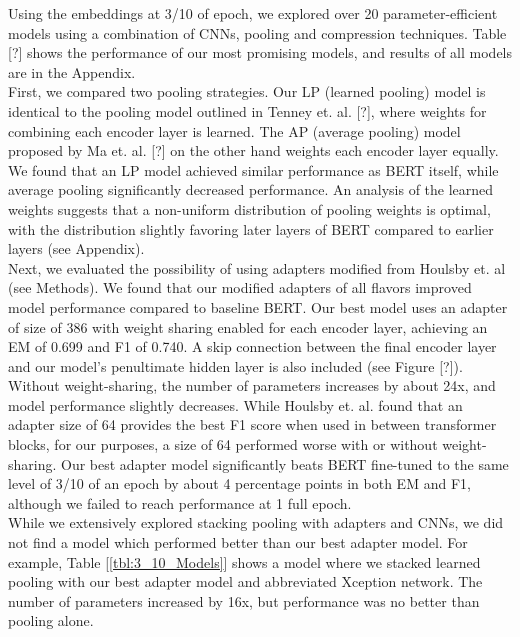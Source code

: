 Using the embeddings at 3/10 of epoch, we explored over 20 parameter-efficient models using a combination of CNNs, pooling and compression techniques. Table [?] shows the performance of our most promising models, and results of all models are in the Appendix. \\

First, we compared two pooling strategies. Our LP (learned pooling) model is identical to the pooling model outlined in Tenney et. al. [?], where weights for combining each encoder layer is learned. The AP (average pooling) model proposed by Ma et. al. [?] on the other hand weights each encoder layer equally. We found that an LP model achieved similar performance as BERT itself, while average pooling significantly decreased performance. An analysis of the learned weights suggests that a non-uniform distribution of pooling weights is optimal, with the distribution slightly favoring later layers of BERT compared to earlier layers (see Appendix). \\

Next, we evaluated the possibility of using adapters modified from Houlsby et. al (see Methods). We found that our modified adapters of all flavors improved model performance compared to baseline BERT. Our best model uses an adapter of size of 386 with weight sharing enabled for each encoder layer, achieving an EM of 0.699 and F1 of 0.740. A skip connection between the final encoder layer and our model’s penultimate hidden layer is also included (see Figure [?]). Without weight-sharing, the number of parameters increases by about 24x, and model performance slightly decreases. While Houlsby et. al. found that an adapter size of 64 provides the best F1 score when used in between transformer blocks, for our purposes, a size of 64 performed worse with or without weight-sharing. Our best adapter model significantly beats BERT fine-tuned to the same level of 3/10 of an epoch by about 4 percentage points in both EM and F1, although we failed to reach performance at 1 full epoch. \\

While we extensively explored stacking pooling with adapters and CNNs, we did not find a model which performed better than our best adapter model. For example, Table [\ref{tbl:3_10_Models}] shows a model where we stacked learned pooling with our best adapter model and abbreviated Xception network. The number of parameters increased by 16x, but performance was no better than pooling alone.

